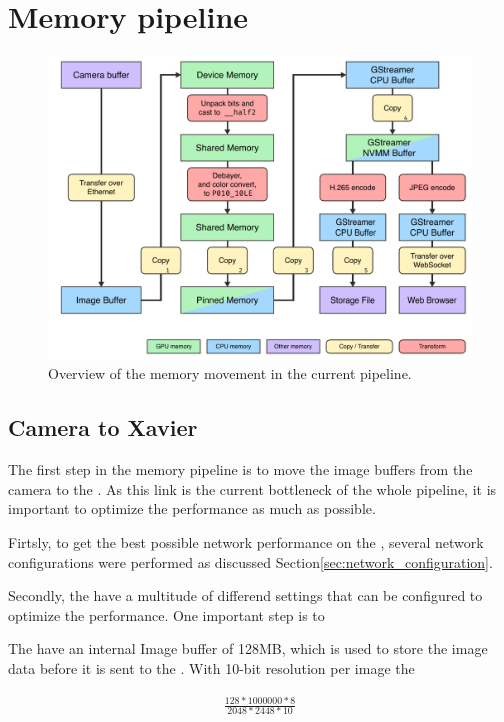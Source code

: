 \section{Memory pipeline}

\begin{figure}[H]
    \centering
    \includegraphics[width=\textwidth]{figures/memory_pipeline/current.pdf}
    \caption{Overview of the memory movement in the current pipeline.}
    \label{fig:pipeline_current}
\end{figure}



\subsection{Camera to Xavier}
The first step in the memory pipeline is to move the image buffers from the camera to the \jx.
As this link is the current bottleneck of the whole pipeline, it is important to optimize the performance as much as possible.

Firtsly, to get the best possible network performance on the \jx, several network configurations were performed as discussed Section\ref{sec:network_configuration}.

Secondly, the \cams have a multitude of differend settings that can be configured to optimize the performance.
One important step is to

The \cams have an internal Image buffer of 128MB, which is used to store the image data before it is sent to the \jx.
With 10-bit resolution per image the


\begin{align}
    \frac{128*1000000*8}{2048*2448*10}
\end{align}

